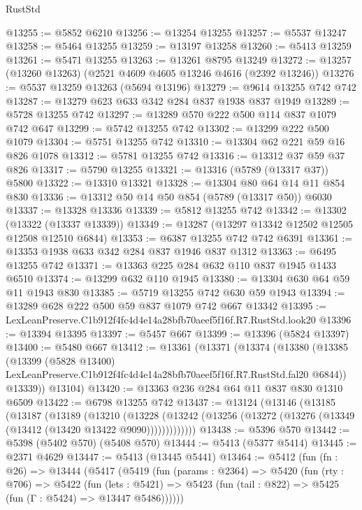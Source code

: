 \begin{lexlean}{RustStd}
\begin{coremodule}
@13255 := @5852 @6210
@13256 := @13254 @13255
@13257 := @5537 @13247
@13258 := @5464 @13255
@13259 := @13197 @13258
@13260 := @5413 @13259
@13261 := @5471 @13255
@13263 := @13261 @8795 @13249
@13272 := @13257 (@13260 @13263) (@2521 @4609 @4605 @13246 @4616 (@2392 @13246))
@13276 := @5537 @13259 @13263 (@5694 @13196)
@13279 := @9614 @13255 @742 @742
@13287 := @13279 @623 @633 @342 @284 @837 @1938 @837 @1949
@13289 := @5728 @13255 @742
@13297 := @13289 @570 @222 @500 @114 @837 @1079 @742 @647
@13299 := @5742 @13255 @742
@13302 := @13299 @222 @500 @1079
@13304 := @5751 @13255 @742
@13310 := @13304 @62 @221 @59 @16 @826 @1078
@13312 := @5781 @13255 @742
@13316 := @13312 @37 @59 @37 @826
@13317 := @5790 @13255
@13321 := @13316 (@5789 (@13317 @37)) @5800
@13322 := @13310 @13321
@13328 := @13304 @80 @64 @14 @11 @854 @830
@13336 := @13312 @50 @14 @50 @854 (@5789 (@13317 @50)) @6030
@13337 := @13328 @13336
@13339 := @5812 @13255 @742
@13342 := @13302 (@13322 (@13337 @13339))
@13349 := @13287 (@13297 @13342 @12502 @12505 @12508 @12510 @6844)
@13353 := @6387 @13255 @742 @742 @6391
@13361 := @13353 @1938 @633 @342 @284 @837 @1946 @837 @1312
@13363 := @6495 @13255 @742
@13371 := @13363 @225 @284 @632 @110 @837 @1945 @1433 @6510
@13374 := @13299 @632 @110 @1945
@13380 := @13304 @630 @64 @59 @11 @1943 @830
@13385 := @5719 @13255 @742 @630 @59 @1943
@13394 := @13289 @628 @222 @500 @59 @837 @1079 @742 @667 @13342
@13395 := LexLeanPreserve.C1b912f4fc4d4e14a28bfb70aeef5f16f.R7.RustStd.look20
@13396 := @13394 @13395
@13397 := @5457 @667
@13399 := @13396 (@5824 @13397)
@13400 := @5480 @667
@13412 := @13361
    (@13371
      (@13374
        (@13380
          (@13385
            (@13399
              (@5828 @13400)
              LexLeanPreserve.C1b912f4fc4d4e14a28bfb70aeef5f16f.R7.RustStd.fal20
              @6844))
          @13339))
      @13104)
@13420 := @13363 @236 @284 @64 @11 @837 @830 @1310 @6509
@13422 := @6798 @13255 @742
@13437 := @13124
    (@13146
      (@13185
        (@13187
          (@13189
            (@13210
              (@13228
                (@13242 (@13256 (@13272 (@13276 (@13349 (@13412 (@13420 @13422 @9090)))))))))))))
@13438 := @5396 @570
@13442 := @5398 (@5402 @570) (@5408 @570)
@13444 := @5413 (@5377 @5414)
@13445 := @2371 @4629
@13447 := @5413 (@13445 @5441)
@13464 := @5412
    (fun (fn : @26) =>
    @13444
      (@5417
        (@5419
          (fun (params : @2364) =>
          @5420
            (fun (rty : @706) =>
            @5422
              (fun (lets : @5421) =>
              @5423 (fun (tail : @822) => @5425 (fun (Γ : @5424) => @13447 @5486))))))

\end{coremodule}
\end{lexlean}
